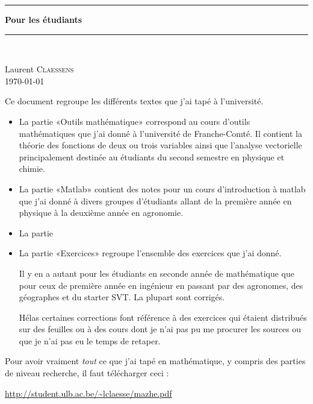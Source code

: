 
\thispagestyle{empty}
\begin{center}
  \begin{minipage}{15cm}
    \hrule\par
    \vspace{2mm}
    \begin{center}
    \Huge \bfseries  Pour les étudiants \par
    \end{center}
    \hrule\par
  \end{minipage}\\
\end{center}

\vspace{2cm}

\begin{center}
    Laurent \textsc{Claessens}\\
    \today
\end{center}

\vfill

\LogoEtLicence

\clearpage

\thispagestyle{empty}

Ce document regroupe les différents textes que j'ai tapé à l'université.
\begin{itemize}
    \item La partie «Outils mathématique» correspond au cours d'outils mathématiques que j'ai donné à l'université de Franche-Comté. Il contient la théorie des fonctions de deux ou trois variables ainsi que l'analyse vectorielle principalement destinée au étudiants du second semestre en physique et chimie.
    \item La partie «Matlab» contient des notes pour un cours d'introduction à matlab que j'ai donné à divers groupes d'étudiants allant de la première année en physique à la deuxième année en agronomie.

    \item La partie

    \item La partie «Exercices» regroupe l'ensemble des exercices que j'ai donné. 
        
        Il y en a autant pour les étudiants en seconde année de mathématique que pour ceux de première année en ingénieur en passant par des agronomes, des géographes et du starter SVT. La plupart sont corrigés. 

        Hélas certaines corrections font référence à des exercices qui étaient distribués sur des feuilles ou à des cours dont je n'ai pas pu me procurer les sources ou que je n'ai pas eu le temps de retaper.
\end{itemize}

\vfill

Pour avoir vraiment \emph{tout} ce que j'ai tapé en mathématique, y compris des parties de niveau recherche, il faut télécharger ceci :
\begin{center}
    \url{http://student.ulb.ac.be/~lclaesse/mazhe.pdf}
\end{center}



\clearpage
